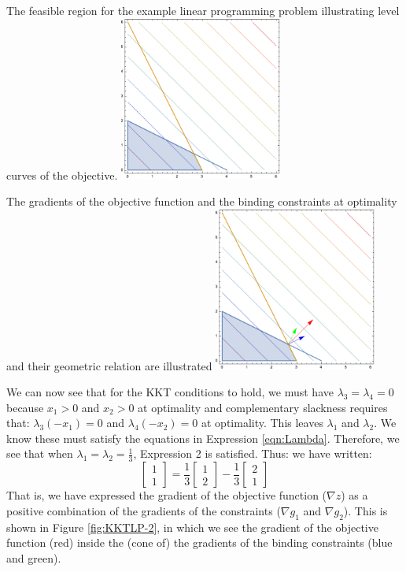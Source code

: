 \begin{FigureCenter}{The feasible region for the example linear programming problem illustrating level curves of the objective.}
    \label{fig:KKTLP-1}
    \includegraphics[width=0.4\textwidth]{imported_figures/KKTLP-1-eps-converted-to.pdf}
\end{FigureCenter}

\begin{FigureCenter}{The gradients of the objective function and the binding constraints at optimality and their geometric relation are illustrated}
    \label{fig:KKTLP-2}
    \includegraphics[width=0.4\textwidth]{imported_figures/KKTLP-2-eps-converted-to.pdf}
\end{FigureCenter}


We can now see that for the KKT conditions to hold, we must have $\lambda_3 = \lambda_4 = 0$ because $x_1 > 0$ and $x_2 > 0$ at optimality and complementary slackness requires that: $\lambda_3(-x_1) = 0$ and $\lambda_4(-x_2) = 0$ at optimality. This leaves $\lambda_1$ and $\lambda_2$. We know these must satisfy the equations in Expression \ref{eqn:Lambda}. Therefore, we see that when $\lambda_1 = \lambda_2 = \tfrac{1}{3}$, Expression 2 is satisfied. Thus: we have written:
\begin{equation}
\begin{bmatrix}1\\1\end{bmatrix} = \frac{1}{3}\begin{bmatrix}1\\2\end{bmatrix} - 
\frac{1}{3}\begin{bmatrix}2\\1\end{bmatrix}
\end{equation}
That is, we have expressed the gradient of the objective function ($\nabla z$) as a positive combination of the gradients of the  constraints ($\nabla g_1$ and $\nabla g_2$). This is shown in Figure \ref{fig:KKTLP-2}, in which we see the gradient of the objective function (red) inside the (cone of) the gradients of the binding constraints (blue and green).

